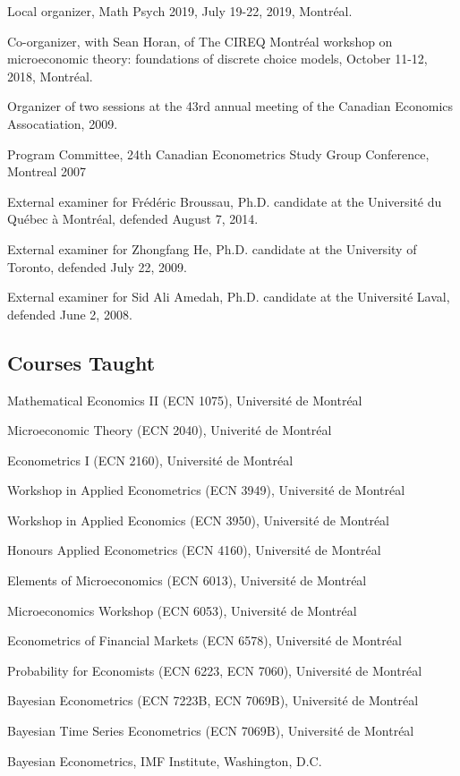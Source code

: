 \documentclass[12pt]{article}
\begin{document}
Local organizer, Math Psych 2019, July 19-22, 2019, Montr\'eal.

Co-organizer, with Sean Horan, of 
The CIREQ Montr\'eal workshop on microeconomic theory: foundations of discrete choice models, October 11-12, 2018, Montr\'eal.

Organizer of two sessions at the 43rd annual meeting of the Canadian Economics Assocatiation, 2009.

Program Committee, 24th Canadian Econometrics Study Group Conference, Montreal 2007

External examiner for Fr\'ed\'eric Broussau,
Ph.D. candidate at the Universit\'e du Qu\'ebec \`a Montr\'eal,
defended August 7, 2014.

External examiner for Zhongfang He,
Ph.D. candidate at the University of Toronto,
defended July 22, 2009.

External examiner for Sid Ali Amedah,
Ph.D. candidate at the Universit\'e Laval,
defended June 2, 2008.

\subsection*{Courses Taught}

Mathematical Economics II (ECN 1075), Universit\'e de Montr\'eal

Microeconomic Theory (ECN 2040), Univerit\'e de Montr\'eal

Econometrics I (ECN 2160), Universit\'e de Montr\'eal

Workshop in Applied Econometrics (ECN 3949), Universit\'e de Montr\'eal

Workshop in Applied Economics (ECN 3950), Universit\'e de Montr\'eal

Honours Applied Econometrics (ECN 4160), Universit\'e de Montr\'eal

Elements of Microeconomics (ECN 6013), Universit\'e de Montr\'eal

Microeconomics Workshop (ECN 6053), Universit\'e de Montr\'eal

Econometrics of Financial Markets (ECN 6578), Universit\'e de Montr\'eal

Probability for Economists (ECN 6223, ECN 7060), Universit\'e de Montr\'eal

Bayesian Econometrics (ECN 7223B, ECN 7069B), Universit\'e de Montr\'eal

Bayesian Time Series Econometrics (ECN 7069B), Universit\'e de Montr\'eal

Bayesian Econometrics, IMF Institute, Washington, D.C.
\end{document}
